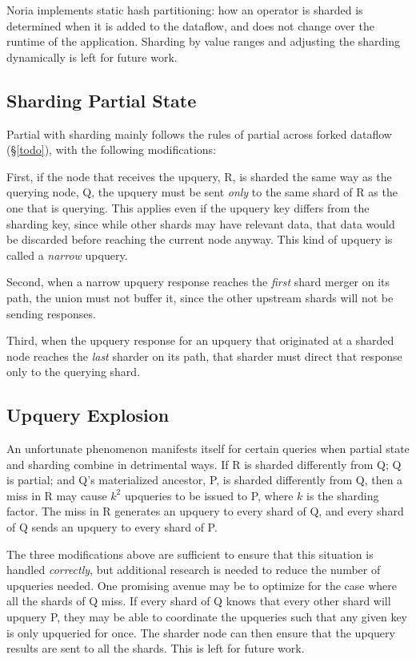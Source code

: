 Noria implements static hash partitioning: how an operator is sharded is
determined when it is added to the dataflow, and does not change over the
runtime of the application. Sharding by value ranges and adjusting the sharding
dynamically is left for future work.

\begin{comment}
  Sharding is tracked based on "ultimately source column". (column tracing)
\end{comment}

\subsection{Sharding Partial State}

Partial with sharding mainly follows the rules of partial across forked dataflow
(\S\ref{todo}), with the following modifications:

First, if the node that receives the upquery, R, is sharded the same way as the
querying node, Q, the upquery must be sent \emph{only} to the same shard of R as
the one that is querying. This applies even if the upquery key differs from the
sharding key, since while other shards may have relevant data, that data would
be discarded before reaching the current node anyway. This kind of upquery is
called a \emph{narrow} upquery.

Second, when a narrow upquery response reaches the \emph{first} shard merger on
its path, the union must not buffer it, since the other upstream shards will not
be sending responses.

Third, when the upquery response for an upquery that originated at a sharded
node reaches the \emph{last} sharder on its path, that sharder must direct that
response only to the querying shard.

\subsection{Upquery Explosion}

An unfortunate phenomenon manifests itself for certain queries when partial
state and sharding combine in detrimental ways. If R is sharded differently from
Q; Q is partial; and Q's materialized ancestor, P, is sharded differently from
Q, then a miss in R may cause $k^2$ upqueries to be issued to P, where $k$ is
the sharding factor. The miss in R generates an upquery to every shard of Q, and
every shard of Q sends an upquery to every shard of P.

The three modifications above are sufficient to ensure that this situation is
handled \emph{correctly}, but additional research is needed to reduce the number
of upqueries needed. One promising avenue may be to optimize for the case where
all the shards of Q miss. If every shard of Q knows that every other shard will
upquery P, they may be able to coordinate the upqueries such that any given key
is only upqueried for once. The sharder node can then ensure that the upquery
results are sent to all the shards. This is left for future work.

